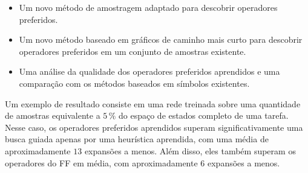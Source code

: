 \documentclass[ppgc,diss,english]{iiufrgs}
\begin{document}
\begin{itemize}
\item Um novo método de amostragem adaptado para descobrir operadores preferidos.
\item Um novo método baseado em gráficos de caminho mais curto para descobrir operadores preferidos em um conjunto de amostras existente.
\item Uma análise da qualidade dos operadores preferidos aprendidos e uma comparação com os métodos baseados em símbolos existentes.
\end{itemize}

Um exemplo de resultado consiste em uma rede treinada sobre uma quantidade de amostras equivalente a $5\,\%$ do espaço de estados completo de uma tarefa. Nesse caso, os operadores preferidos aprendidos superam significativamente uma busca guiada apenas por uma heurística aprendida, com uma média de aproximadamente $13$ expansões a menos. Além disso, eles também superam os operadores do FF em média, com aproximadamente $6$ expansões a menos.
\end{document}
